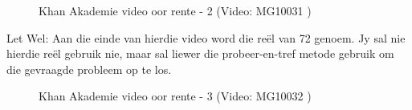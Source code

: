 \begin{figure}[H] %
    \textnormal{Khan Akademie video oor rente  - 2}
    \vspace{.1in}
    \nopagebreak
     { (Video:  MG10031 )}
\end{figure}

Let Wel: Aan die einde van hierdie video word die reël van 72 genoem. Jy sal nie hierdie reël gebruik nie, maar
sal liewer die probeer-en-tref metode gebruik om die gevraagde probleem op te los.

\begin{figure}[H] %
    \textnormal{Khan Akademie video oor rente  - 3}
    \vspace{.1in}
    \nopagebreak
     { (Video:  MG10032 )}
\end{figure}


